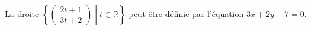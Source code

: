 La droite  $\left\{\begin{pmatrix}2t+1\\3t+2\end{pmatrix}\middle| t\in\mathbb{R}\right\}$ peut être définie par l'équation $3x+2y-7=0$.

\begin{reponses}
\end{reponses}

